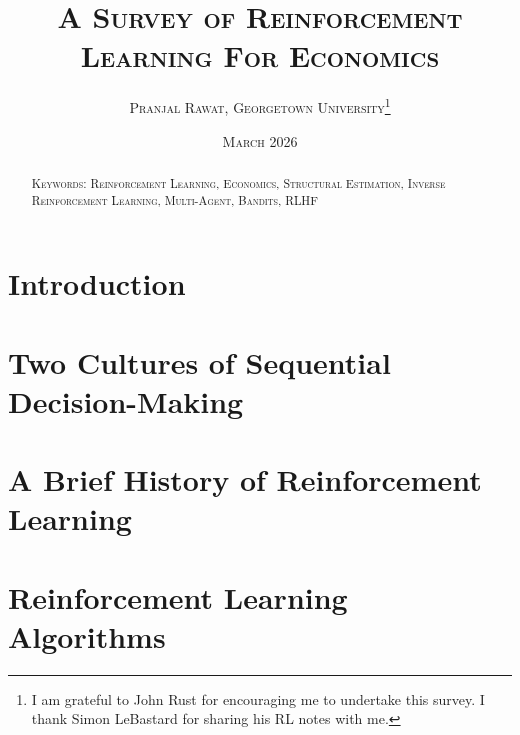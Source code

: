 \documentclass[11pt,notitlepage,a4paper]{article}
\begin{document}
\begin{titlepage}
\title{\textsc{A Survey of Reinforcement Learning For Economics}}
\author{
\textsc{Pranjal Rawat, Georgetown University}\thanks{I am grateful to John Rust for encouraging me to undertake this survey. I thank Simon LeBastard for sharing his RL notes with me.}\\
}
\date{\textsc{March 2026}}

\maketitle
\thispagestyle{empty}


\begin{abstract}
\noindent

\bigskip

\noindent \textsc{Keywords: Reinforcement Learning, Economics, Structural Estimation, Inverse Reinforcement Learning, Multi-Agent, Bandits, RLHF}

\end{abstract}

\end{titlepage}

\newpage
\setcounter{tocdepth}{2}  %
\tableofcontents
\newpage

\section{Introduction}
\label{section:intro}


\section{Two Cultures of Sequential Decision-Making}
\label{section:language}


\section{A Brief History of Reinforcement Learning}
\label{section:history}


\section{Reinforcement Learning Algorithms}
\label{section:rl_algorithms}



\end{document}
